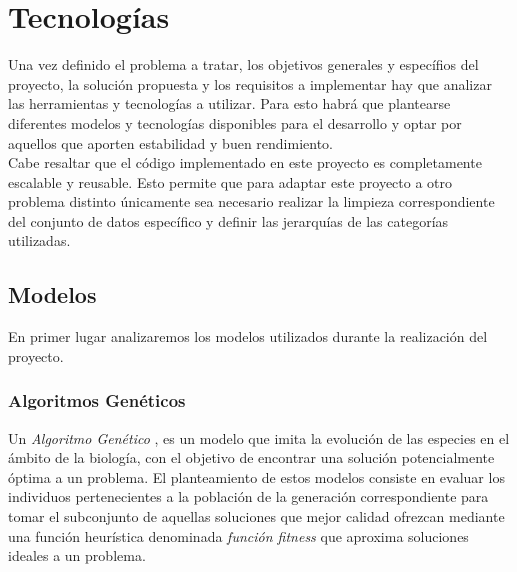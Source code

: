 
\chapter{Tecnologías}
\label{3.Tecnologias}

    Una vez definido el problema a tratar, los objetivos generales y específios del proyecto, la solución propuesta y los requisitos a implementar hay que analizar las herramientas y tecnologías a utilizar. Para esto habrá que plantearse diferentes modelos y tecnologías disponibles para el desarrollo y optar por aquellos que aporten estabilidad y buen rendimiento.\\

    Cabe resaltar que el código implementado en este proyecto es completamente escalable y reusable. Esto permite que para adaptar este proyecto a otro problema distinto únicamente sea necesario realizar la limpieza correspondiente del conjunto de datos específico y definir las jerarquías de las categorías utilizadas.

    \section{Modelos}

        En primer lugar analizaremos los modelos utilizados durante la realización del proyecto.

        \subsection {Algoritmos Genéticos}
            Un \textit{Algoritmo Genético} \cite{GA}, es un modelo que imita la evolución de las especies en el ámbito de la biología, con el objetivo de encontrar una solución potencialmente óptima a un problema. El planteamiento de estos modelos consiste en evaluar los individuos pertenecientes a la población de la generación correspondiente para tomar el subconjunto de aquellas soluciones que mejor calidad ofrezcan mediante una función heurística denominada \textit{función fitness} que aproxima soluciones ideales a un problema.\\

